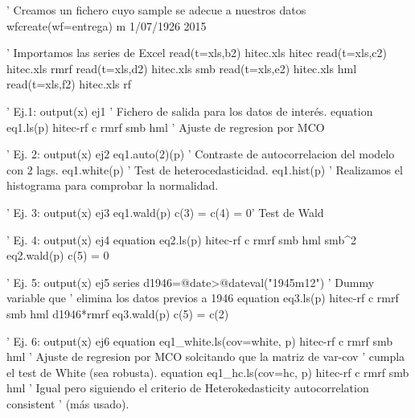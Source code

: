 

' Creamos un fichero cuyo sample se adecue a nuestros datos
wfcreate(wf=entrega) m 1/07/1926 2015

' Importamos las series de Excel
read(t=xls,b2) hitec.xls hitec
read(t=xls,c2) hitec.xls rmrf
read(t=xls,d2) hitec.xls smb
read(t=xls,e2) hitec.xls hml
read(t=xls,f2) hitec.xls rf

' Ej.1: 
output(x) ej1 ' Fichero de salida para los datos de interés.
equation eq1.ls(p) hitec-rf c rmrf smb hml ' Ajuste de regresion por MCO 

' Ej. 2:
output(x) ej2
eq1.auto(2)(p)   ' Contraste de autocorrelacion del modelo con 2 lags.
eq1.white(p) ' Test de heterocedasticidad.
eq1.hist(p) ' Realizamos el histograma para comprobar la normalidad.

' Ej. 3:
output(x) ej3
eq1.wald(p) c(3) = c(4) = 0' Test de Wald

' Ej. 4:
output(x) ej4
equation eq2.ls(p) hitec-rf c rmrf smb hml smb^2
eq2.wald(p) c(5) = 0

' Ej. 5:
output(x) ej5
series d1946=@date>@dateval("1945m12") ' Dummy variable que 
' elimina los datos previos a 1946
equation eq3.ls(p) hitec-rf c rmrf smb hml d1946*rmrf
eq3.wald(p) c(5) = c(2)

' Ej. 6:
output(x) ej6
equation eq1_white.ls(cov=white, p) hitec-rf c rmrf smb hml 
' Ajuste de regresion por MCO solcitando que la matriz de var-cov
' cumpla el test de White (sea robusta).
equation eq1_hc.ls(cov=hc, p) hitec-rf c rmrf smb hml 
' Igual pero siguiendo el criterio de Heterokedasticity autocorrelation consistent
' (más usado). 

